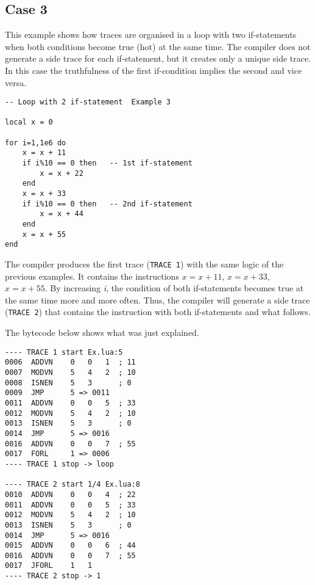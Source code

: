 \newpage

\subsection{Case 3}
\label{2-if-example3}
This example shows how traces are organised in a loop with two if-statements when both conditions become true (hot) at the same time. The compiler does not generate a side trace for each if-statement, but it creates only a unique side trace. In this case the truthfulness of the first if-condition implies the second and vice versa.
\begin{mdframed}[style=LuaStyleFrame]
\begin{lstlisting}[style=LuaStyle]
-- Loop with 2 if-statement  Example 3

local x = 0

for i=1,1e6 do
	x = x + 11
	if i%10 == 0 then   -- 1st if-statement
		x = x + 22
	end
	x = x + 33
	if i%10 == 0 then   -- 2nd if-statement
		x = x + 44
	end
	x = x + 55
end
\end{lstlisting}
\end{mdframed}
The compiler produces the first trace (\texttt{TRACE 1}) with the same logic of the previous examples. It contains the instructions $x=x+11$, $x=x+33$, $x=x+55$. By increasing \textit{i}, the condition of both if-statements becomes true at the same time more and more often. Thus, the compiler will generate a side trace (\texttt{TRACE 2}) that contains the instruction with both if-statements and what follows.

The bytecode below shows what was just explained.

\begin{multicols}{2}
\begin{lstlisting}[style=DumpStyle]
---- TRACE 1 start Ex.lua:5
0006  ADDVN    0   0   1  ; 11
0007  MODVN    5   4   2  ; 10
0008  ISNEN    5   3      ; 0
0009  JMP      5 => 0011
0011  ADDVN    0   0   5  ; 33
0012  MODVN    5   4   2  ; 10
0013  ISNEN    5   3      ; 0
0014  JMP      5 => 0016
0016  ADDVN    0   0   7  ; 55
0017  FORL     1 => 0006
---- TRACE 1 stop -> loop

---- TRACE 2 start 1/4 Ex.lua:8
0010  ADDVN    0   0   4  ; 22
0011  ADDVN    0   0   5  ; 33
0012  MODVN    5   4   2  ; 10
0013  ISNEN    5   3      ; 0
0014  JMP      5 => 0016
0015  ADDVN    0   0   6  ; 44
0016  ADDVN    0   0   7  ; 55
0017  JFORL    1   1
---- TRACE 2 stop -> 1
\end{lstlisting}
\end{multicols}

